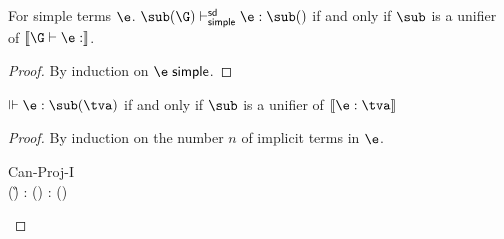 \documentclass[acmsmall,screen,nonacm,review]{acmart}
\begin{document}
\begin{lemma}
  For simple terms $\e$.
  $\sub(\G) \thsimplesd \e : \sub(\t)$ if and only if $\sub$ is a unifier of $\csem {\G \th \e : \t}$.
  \begin{proof}
    By induction on $\e \simple$.
  \end{proof}
\end{lemma}

\newcommand{\ThTypPf}[4]{\Pf{#1}{\Th}{#2 : #3}{#4}}
\newcommand{\thTypPf}[4]{\Pf{#1}{\th}{#2 : #3}{#4}}
\newcommand{\UnifierPf}[3]{\Pf{#1}{\text{unifies}}{#2}{#3}}
\newcommand{\eshapePf}[4]{\Pf{}{}{\eshape {#1} {#2} {#3}}{#4}}
\begin{theorem}
  $\Th \e : \sub(\tv)$ if and only if $\sub$ is a unifier of $\csem {\e : \tv}$
  \begin{proof}
    By induction on the number $n$ of implicit terms in $\e$.
    \begin{proofcases}

	\begin{llproof}
\Hand	  {}
	\end{llproof}


	\begin{proofcases}
	  \proofcase{$\implies$}

	  \begin{proofcases}

	    \proofcasederivation
	      {Can-Proj-I}
	      {\eshape \E \e {\any \tvcs \Pi\iton \tvcs} \\ \sub(\G) \Th \E{} : \sub(\tv)}
	      {\Th \E{} : \sub(\tv)}


\end{proofcases}
\end{proofcases}
\end{proofcases}
\end{proof}
\end{theorem}
\end{document}
